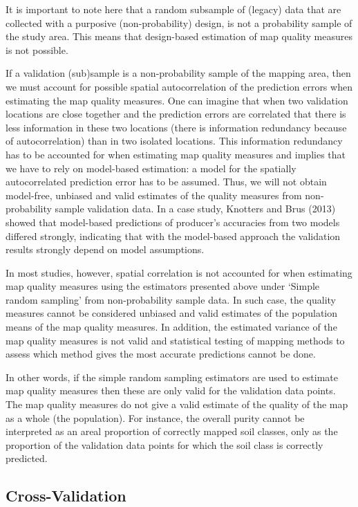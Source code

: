 \documentclass[10pt,b5paper,]{book}
\theoremstyle{definition}
\theoremstyle{definition}
\theoremstyle{definition}
\theoremstyle{remark}
\begin{document}
It is important to note here that a random subsample of (legacy) data
that are collected with a purposive (non-probability) design, is not a
probability sample of the study area. This means that design-based
estimation of map quality measures is not possible.

If a validation (sub)sample is a non-probability sample of the mapping
area, then we must account for possible spatial autocorrelation of the
prediction errors when estimating the map quality measures. One can
imagine that when two validation locations are close together and the
prediction errors are correlated that there is less information in these
two locations (there is information redundancy because of
autocorrelation) than in two isolated locations. This information
redundancy has to be accounted for when estimating map quality measures
and implies that we have to rely on model-based estimation: a model for
the spatially autocorrelated prediction error has to be assumed. Thus,
we will not obtain model-free, unbiased and valid estimates of the
quality measures from non-probability sample validation data. In a case
study, Knotters and Brus (2013) showed that model-based predictions of
producer's accuracies from two models differed strongly, indicating that
with the model-based approach the validation results strongly depend on
model assumptions.

In most studies, however, spatial correlation is not accounted for when
estimating map quality measures using the estimators presented above
under `Simple random sampling' from non-probability sample data. In such
case, the quality measures cannot be considered unbiased and valid
estimates of the population means of the map quality measures. In
addition, the estimated variance of the map quality measures is not
valid and statistical testing of mapping methods to assess which method
gives the most accurate predictions cannot be done.

In other words, if the simple random sampling estimators are used to
estimate map quality measures then these are only valid for the
validation data points. The map quality measures do not give a valid
estimate of the quality of the map as a whole (the population). For
instance, the overall purity cannot be interpreted as an areal
proportion of correctly mapped soil classes, only as the proportion of
the validation data points for which the soil class is correctly
predicted.

\hypertarget{xval}{%
\subsection{Cross-Validation}\label{xval}}
\end{document}
